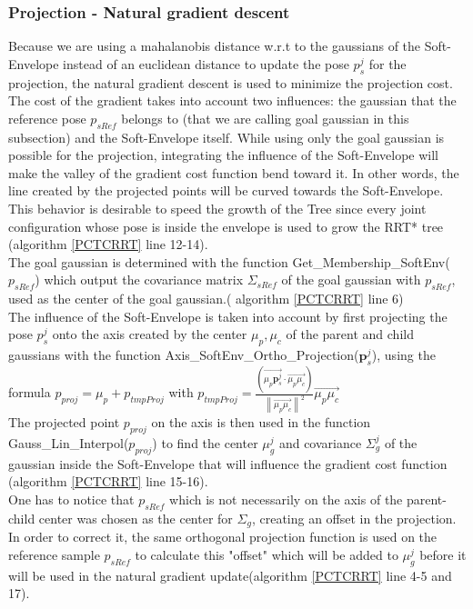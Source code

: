 \documentclass[letterpaper, 10 pt, conference]{ieeeconf}  %
\newcommand{\mb}[1]{{\boldsymbol{#1}}}
\newcommand\norm[1]{\left\lVert#1\right\rVert}
\begin{document}
\subsubsection{Projection - Natural gradient descent}\leavevmode\par

Because we are using a mahalanobis distance w.r.t to the gaussians of the Soft-Envelope instead of an euclidean distance to update the pose $p_s^j$ for the projection, the natural gradient descent is used \cite{WhyAdaptiveGrad} to minimize the projection cost. The cost of the gradient takes into account two influences: the gaussian that the reference pose $p_{sRef}$ belongs to (that we are calling goal gaussian in this subsection) and the Soft-Envelope itself. While using only the goal gaussian is possible for the projection, integrating the influence of the Soft-Envelope will make the valley of the gradient cost function bend toward it. In other words, the line created by the projected points will be curved towards the Soft-Envelope. This behavior is desirable to speed the growth of the Tree since every joint configuration whose pose is inside the envelope is used to grow the RRT* tree (algorithm \ref{PCTCRRT} line 12-14).\\
The goal gaussian is determined with the function {\selectfont Get\_Membership\_SoftEnv($p_{sRef}$)} which output the covariance matrix $\Sigma_{sRef}$ of the goal gaussian with $p_{sRef}$, used as the center of the goal gaussian.( algorithm \ref{PCTCRRT} line 6)\\
The influence of the Soft-Envelope is taken into account by first projecting the pose $p_s^j$ onto the axis created by the center $\mu_p, \mu_c$ of the parent and child gaussians with the function {\selectfont Axis\_SoftEnv\_Ortho\_Projection($\mb{p}_s^j$)}, using the formula $p_{proj} = \mu_p + p_{tmpProj}$ with $p_{tmpProj}=\frac{ (\overrightarrow{\mu_p\mb{p}_s^j} \cdot \overrightarrow{\mu_p\mu_c})}{\norm{\overrightarrow{\mu_p\mu_c}}^2}\overrightarrow{\mu_p\mu_c} $ \\
The projected point $p_{proj}$ on the axis is then used in the function {\selectfont Gauss\_Lin\_Interpol($p_{proj}$)} to find the center $\mu_g^j$ and covariance $\Sigma_g^j$ of the gaussian inside the Soft-Envelope that will influence the gradient cost function (algorithm \ref{PCTCRRT} line 15-16).\\

One has to notice that $p_{sRef}$ which is not necessarily on the axis of the parent-child center was chosen as the center for $\Sigma_g$, creating an offset in the projection. In order to correct it, the same orthogonal projection function is used on the reference sample $p_{sRef}$ to calculate this "offset" which will be added to  $\mu_g^j$ before it will be used in the natural gradient update(algorithm \ref{PCTCRRT} line 4-5 and 17).\\
\end{document}

